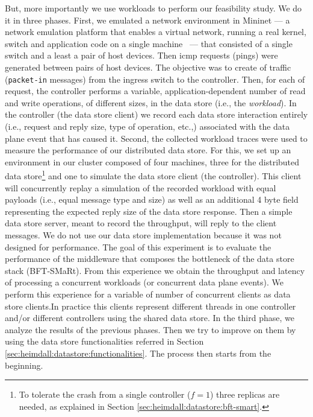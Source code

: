 But, more importantly we use workloads to perform our feasibility study. 
We do it in three phases. 
First, we emulated a network environment in Mininet  --- a network emulation platform that enables a virtual network, running a real kernel, switch and application code on a single machine~\cite{Handigol:2012t} ---  that consisted of a single switch and a least a pair of host devices.
Then \gls{icmp} requests (pings) were generated between pairs of host devices. 
The objective was to create \gls{of}  traffic (\texttt{packet-in} messages) from the ingress switch to the controller.
Then, for each \gls{of} request, the controller performs a variable, application-dependent number of read and write operations, of different sizes, in the data store (i.e., the \textit{workload}). 
In the controller  (the data store client) we record each data store interaction entirely (i.e., request and reply size, type of operation, etc.,)  associated with the data plane event that has caused it. 
Second, the collected workload traces were used to measure the performance of our distributed data store.
For this, we set up an environment in our cluster composed of four machines, three for the distributed data store\footnote{To tolerate the crash from a single controller ($f=1$) three replicas are needed, as explained in Section \ref{sec:heimdall:datastore:bft-smart}.} and one to simulate the data store client (the controller). 
This client will concurrently replay a simulation of the recorded workload with equal payloads (i.e., equal message type and size) as well as an additional 4 byte field representing the expected reply size of the data store response. Then a simple data store server, meant to record the throughput, will reply to the client messages. We do not use our data store implementation because it was not designed for performance. The  goal of this experiment is to evaluate the performance of the middleware that  composes the bottleneck of the data store stack (BFT-SMaRt). 
From this experience we obtain the throughput and latency of processing a concurrent workloads (or concurrent data plane events).  We perform this experience for a variable of number of concurrent clients as data store clients.In practice this clients represent different threads in one controller and/or different controllers using the shared data store. 
In the third phase, we analyze the results of the previous phases. Then we try to improve on them by using the data store functionalities referred in Section \ref{sec:heimdall:datastore:functionalities}. The process then starts from the beginning. 

